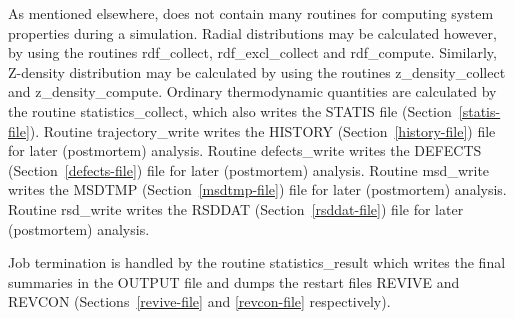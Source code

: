 As mentioned elsewhere, \D does not contain many routines for
computing system properties during a simulation.  Radial
distributions may be calculated however, by using the routines
{\sc rdf\_collect}, {\sc rdf\_excl\_collect} and {\sc rdf\_compute}.
Similarly, Z-density distribution may be calculated by using the
routines {\sc z\_density\_collect} and {\sc z\_density\_compute}.
Ordinary thermodynamic quantities are calculated by the routine
{\sc statistics\_collect}, which also writes the STATIS file
(Section~\ref{statis-file}).  Routine {\sc trajectory\_write} writes the
HISTORY (Section~\ref{history-file}) file for later (postmortem)
analysis.  Routine {\sc defects\_write} writes the DEFECTS
(Section~\ref{defects-file}) file for later (postmortem) analysis.
Routine {\sc msd\_write} writes the MSDTMP (Section~\ref{msdtmp-file})
file for later (postmortem) analysis.  Routine {\sc rsd\_write}
writes the RSDDAT (Section~\ref{rsddat-file}) file for later
(postmortem) analysis.

Job termination is handled by the routine {\sc statistics\_result}
which writes the final summaries in the OUTPUT file and dumps the
restart files REVIVE and REVCON (Sections~\ref{revive-file} and
\ref{revcon-file} respectively).
